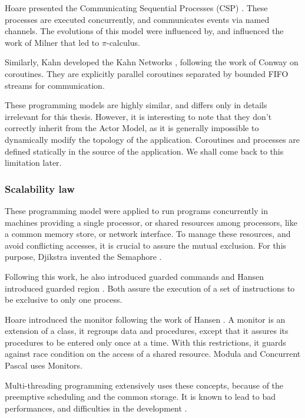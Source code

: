 Hoare presented the Communicating Sequential Processes (CSP) \cite{Hoare1978, Brookes1984}.
These processes are executed concurrently, and communicates events via named channels.
The evolutions of this model were influenced by, and influenced the work of Milner that led to $\pi$-calculus.

Similarly, Kahn developed the Kahn Networks \cite{Kahn1974, Kahn1976}, following the work of Conway on coroutines.
They are explicitly parallel coroutines separated by bounded FIFO streams for communication.

These programming models are highly similar, and differs only in details irrelevant for this thesis.
However, it is interesting to note that they don't correctly inherit from the Actor Model, as it is generally impossible to dynamically modify the topology of the application.
Coroutines and processes are defined statically in the source of the application.
We shall come back to this limitation later.

\subsubsection{Scalability law}

These programming model were applied to run programs concurrently in machines providing a single processor, or shared resources among processors, like a common memory store, or network interface.
To manage these resources, and avoid conflicting accesses, it is crucial to assure the mutual exclusion.
For this purpose, Djikstra invented the Semaphore \cite{Dijkstra}.

Following this work, he also introduced guarded commands \cite{Dijkstra1975} and Hansen introduced guarded region \cite{Hansen1978a}.
Both assure the execution of a set of instructions to be exclusive to only one process.

Hoare introduced the monitor following the work of Hansen \cite{Hoare1974}.
A monitor is an extension of a class, it regroups data and procedures, except that it assures its procedures to be entered only once at a time.
With this restrictions, it guards against race condition on the access of a shared resource.
Modula \cite{Wirth1977} and Concurrent Pascal \cite{Hansen1975} uses Monitors.

Multi-threading programming extensively uses these concepts, because of the preemptive scheduling and the common storage.
It is known to lead to bad performances, and difficulties in the development \cite{Adya2002}.

